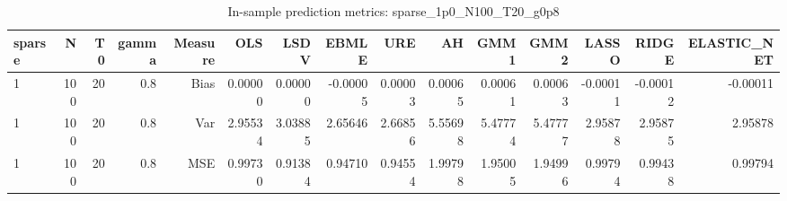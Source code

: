 \begin{table}[!htbp]\centering
\caption{In-sample prediction metrics: sparse_1p0_N100_T20_g0p8}
\label{tab:table2_sparse_1p0_N100_T20_g0p8}
\begin{tabular}{lrrrrrrrrrrrrrr}
\hline
sparse & N & T0 & gamma & Measure & OLS & LSDV & EBMLE & URE & AH & GMM1 & GMM2 & LASSO & RIDGE & ELASTIC_NET \\
\hline
1 & 100 & 20 & 0.8 & Bias & 0.00000 & 0.00000 & -0.00005 & 0.00003 & 0.00065 & 0.00061 & 0.00063 & -0.00011 & -0.00012 & -0.00011 \\
1 & 100 & 20 & 0.8 & Var & 2.95534 & 3.03885 & 2.65646 & 2.66856 & 5.55698 & 5.47774 & 5.47777 & 2.95878 & 2.95875 & 2.95878 \\
1 & 100 & 20 & 0.8 & MSE & 0.99730 & 0.91384 & 0.94710 & 0.94554 & 1.99798 & 1.95005 & 1.94996 & 0.99794 & 0.99438 & 0.99794 \\
\hline
\end{tabular}
\end{table}

